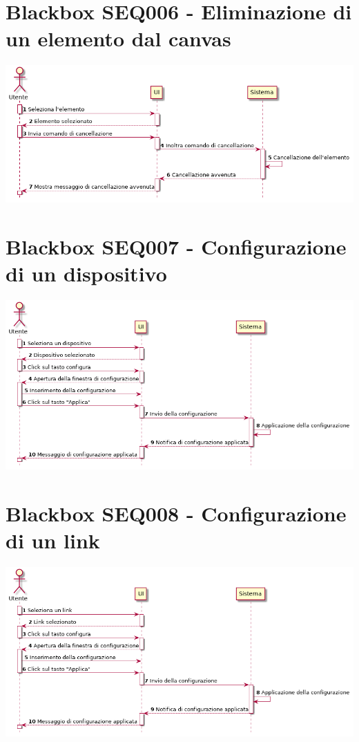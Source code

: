 \documentclass[../main.tex]{subfiles}
\begin{document}
\section{Blackbox SEQ006 - Eliminazione di un elemento dal canvas }
\figure[H]
\centering
\includegraphics[width=14cm]{capitoli/usecases_diagrams/diagrams/SEQ006.png}
\endfigure
\section{Blackbox SEQ007 - Configurazione di un dispositivo }
\figure[H]
\centering
\includegraphics[width=14cm]{capitoli/usecases_diagrams/diagrams/SEQ007.png}
\endfigure
\section{Blackbox SEQ008 - Configurazione di un link }
\figure[H]
\centering
\includegraphics[width=14cm]{capitoli/usecases_diagrams/diagrams/SEQ008.png}
\endfigure
\end{document}
